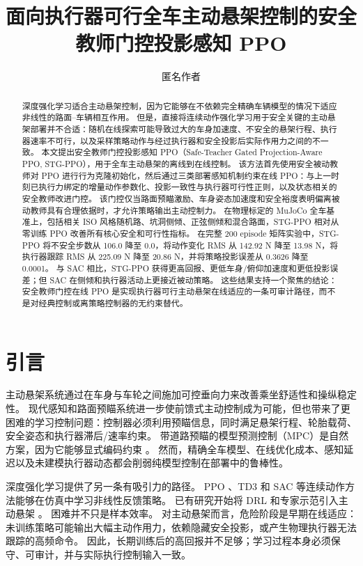 \documentclass[UTF8,letterpaper,twocolumn]{ctexart}
\title{面向执行器可行全车主动悬架控制的安全教师门控投影感知 PPO}
\author{匿名作者}
\date{}
\begin{document}
\maketitle

\begin{abstract}
深度强化学习适合主动悬架控制，因为它能够在不依赖完全精确车辆模型的情况下适应非线性的路面--车辆相互作用。
但是，直接将连续动作强化学习用于安全关键的主动悬架部署并不合适：随机在线探索可能导致过大的车身加速度、不安全的悬架行程、执行器速率不可行，以及采样策略动作与经过执行器和安全投影后实际作用力之间的不一致。
本文提出安全教师门控投影感知 PPO（Safe-Teacher Gated Projection-Aware PPO, STG-PPO），用于全车主动悬架的离线到在线控制。
该方法首先使用安全被动教师对 PPO 进行行为克隆初始化，然后通过三类部署感知机制约束在线 PPO：与上一时刻已执行力绑定的增量动作参数化、投影一致性与执行器可行性正则，以及状态相关的安全教师改进门控。
该门控仅当路面预瞄激励、车身姿态加速度和安全裕度表明偏离被动教师具有合理依据时，才允许策略输出主动控制力。
在物理标定的 MuJoCo 全车基准上，包括相关 ISO 风格随机路、坑洞侧倾、正弦侧倾和混合路面，STG-PPO 相对从零训练 PPO 改善所有核心安全和可行性指标。
在完整 200 episode 矩阵实验中，STG-PPO 将不安全步数从 106.0 降至 0.0，将动作变化 RMS 从 142.92 N 降至 13.98 N，将执行器跟踪 RMS 从 225.09 N 降至 20.86 N，并将策略投影误差从 0.3626 降至 0.0001。
与 SAC 相比，STG-PPO 获得更高回报、更低车身/俯仰加速度和更低投影误差；但 SAC 在侧倾和执行器活动上更接近被动策略。
这些结果支持一个聚焦的结论：安全教师门控在线 PPO 是实现执行器可行主动悬架在线适应的一条可审计路径，而不是对经典控制或离策略控制器的无约束替代。
\end{abstract}

\section{引言}

主动悬架系统通过在车身与车轮之间施加可控垂向力来改善乘坐舒适性和操纵稳定性。
现代感知和路面预瞄系统进一步使前馈式主动控制成为可能，但也带来了更困难的学习控制问题：控制器必须利用预瞄信息，同时满足悬架行程、轮胎载荷、安全姿态和执行器滞后/速率约束。
带道路预瞄的模型预测控制（MPC）是自然方案，因为它能够显式编码约束 \citep{papadimitrakis2022preview_mpc,li2024speed_preview_mpc}。
然而，精确全车模型、在线优化成本、感知延迟以及未建模执行器动态都会削弱纯模型控制在部署中的鲁棒性。

深度强化学习提供了另一条有吸引力的路径。
PPO \citep{schulman2017ppo}、TD3 \citep{fujimoto2018td3} 和 SAC \citep{haarnoja2018sac} 等连续动作方法能够在仿真中学习非线性反馈策略。
已有研究开始将 DRL 和专家示范引入主动悬架 \citep{tan2024active_demo}。
困难并不只是样本效率。
对主动悬架而言，危险阶段是早期在线适应：未训练策略可能输出大幅主动作用力，依赖隐藏安全投影，或产生物理执行器无法跟踪的高频命令。
因此，长期训练后的高回报并不足够；学习过程本身必须保守、可审计，并与实际执行控制输入一致。
\end{document}
